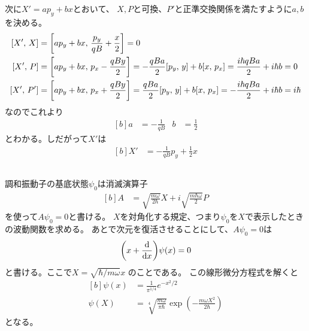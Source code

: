 \documentclass[../../master.tex]{subfiles}
\begin{document}
次に\(X' = ap_y+bx\)とおいて、
\(X,P\)と可換、\(P'\)と正準交換関係を満たすように\(a,b\)を決める。
\begin{equation}\begin{aligned}[b]
    [X',\,X] &= \qty[ap_y+bx,\,\frac{p_y}{qB}+\frac{x}{2}]
    =0\\
    [X',\,P] &= \qty[ap_y+bx,\,p_x-\frac{qBy}{2}] = -\frac{qBa}{2}[p_y,\,y]+b[x,\,p_x] = \frac{i\hbar qBa}{2} + i\hbar b  = 0\\
    [X',\,P'] &= \qty[ap_y+bx,\,p_x+\frac{qBy}{2}] = \frac{qBa}{2}[p_y,\,y]+b[x,\,p_x] = - \frac{i\hbar qBa}{2} + i\hbar b = i\hbar\\
\end{aligned}\end{equation}
なのでこれより
\begin{equation}\begin{aligned}[b]
    a &=  -\frac{1}{qB} & b&= \frac{1}{2}
\end{aligned}\end{equation}
とわかる。しだがって\(X'\)は
\begin{equation}\begin{aligned}[b]
    X' &= -\frac{1}{qB}p_y + \frac{1}{2}x
\end{aligned}\end{equation}

\subsection{}
調和振動子の基底状態\(\psi_0\)は消滅演算子
\begin{equation}\begin{aligned}[b]
    A &= \sqrt{\frac{m\omega}{2\hbar}}X + i\sqrt{\frac{m\hbar\omega}{2}}P
\end{aligned}\end{equation}
を使って\(A\psi_0 = 0\)と書ける。
\(X\)を対角化する規定、つまり\(\psi_0\)を\(X\)で表示したときの波動関数を求める。
あとで次元を復活させることにして、\(A\psi_0 = 0\)は
\begin{equation}\begin{aligned}[b]
    \qty(x+\dv{x})\psi(x) = 0
\end{aligned}\end{equation}
と書ける。ここで\(X = \sqrt{\hbar/m\omega} x\) のことである。
この線形微分方程式を解くと
\begin{equation}\begin{aligned}[b]
    \psi(x) &= \frac{1}{\pi^{1/4}}e^{-x^2/2}\\
    \psi(X) &= \sqrt[4]{\frac{m\omega}{\pi \hbar}} \exp(-\frac{m\omega X^2}{2\hbar})
\end{aligned}\end{equation}
となる。
\end{document}
